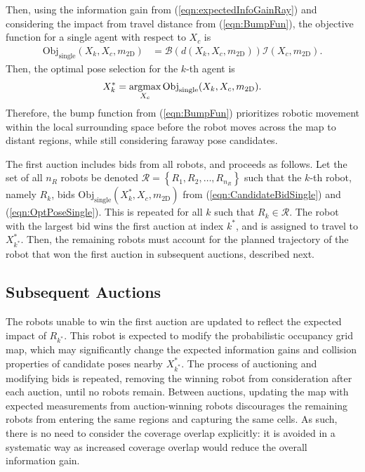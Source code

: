 \documentclass[smallextended]{svjour3}       %
\newcommand{\braces}[1]{\ensuremath{\left\{ #1 \right\}}}
\newcommand{\refeqn}[1]{(\ref{eqn:#1})}
\newcommand{\argmax}{\operatornamewithlimits{argmax}}
\begin{document}
Then, using the information gain from \refeqn{expectedInfoGainRay} and considering the impact from travel distance from \refeqn{BumpFun}, the objective function for a single agent with respect to $X_{c}$ is
\begin{align}
\label{eqn:CandidateBidSingle}
\text{Obj}_\text{single}(X_k,X_c,m_\text{2D})&=\mathcal B(d(X_k,X_c,m_\text{2D}))\mathcal I(X_{c},m_\text{2D}).
\end{align}
Then, the optimal pose selection for the $k$-th agent is
\begin{align}
\label{eqn:OptPoseSingle}
X^*_{k}=\argmax_{X_c}\text{Obj}_\text{single}(X_k,X_c,m_\text{2D}).
\end{align}
Therefore, the bump function from \refeqn{BumpFun} prioritizes robotic movement within the local surrounding space before the robot moves across the map to distant regions, while still considering faraway pose candidates.

The first auction includes bids from all robots, and proceeds as follows. Let the set of all $n_R$ robots be denoted $\mathcal R=\braces{R_1,R_2,\dots,R_{n_R}}$ such that the $k$-th robot, namely $R_k$, bids $\text{Obj}_\text{single}(X^*_k,X_c,m_\text{2D})$ from \refeqn{CandidateBidSingle} and \refeqn{OptPoseSingle}. This is repeated for all $k$ such that $R_k\in\mathcal R$. The robot with the largest bid wins the first auction at index $k^*$, and is assigned to travel to $X^*_{k^*}$. Then, the remaining robots must account for the planned trajectory of the robot that won the first auction in subsequent auctions, described next.

\subsection{Subsequent Auctions}

The robots unable to win the first auction are updated to reflect the expected impact of $R_{k^*}$. This robot is expected to modify the probabilistic occupancy grid map, which may significantly change the expected information gains and collision properties of candidate poses nearby $X^*_{k^*}$. The process of auctioning and modifying bids is repeated, removing the winning robot from consideration after each auction, until no robots remain. Between auctions, updating the map with expected measurements from auction-winning robots discourages the remaining robots from entering the same regions and capturing the same cells. As such, there is no need to consider the coverage overlap explicitly: it is avoided in a systematic way as increased coverage overlap would reduce the overall information gain.
\end{document}
